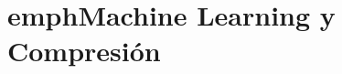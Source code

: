 


\chapter[Machine Learning y Compresión ]{emph{Machine Learning} y Compresión  } 
\label{ch:Compresion-Machine-Learning}










